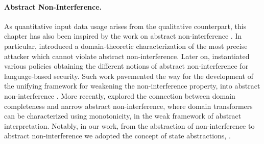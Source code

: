 \newcommand*{\entropypartitions}[1][\defprogram]{\Pi(#1)}
\newcommand*{\exampleinput}{\textsc{Input}_\defprogram}

\paragraph{Abstract Non-Interference.}
As quantitative input data usage arises from the qualitative counterpart, this chapter has also been inspired by the work on abstract non-interference . In particular,  introduced a domain-theoretic characterization of the most precise attacker which cannot violate abstract non-interference.
Later on,  instantiated various policies obtaining the different notions of abstract non-interference for language-based security.
Such work pavemented the way for the development of the unifying framework for weakening the non-interference property, into abstract non-interference \cite{Giacobazzi2018}. More recently,  explored the connection between domain completeness and narrow abstract non-interference, where domain transformers can be characterized using monotonicity, in the weak framework of abstract interpretation. Notably, in our work, from the abstraction of non-interference to abstract non-interference we adopted the concept of state abstractions, \cf{} .

